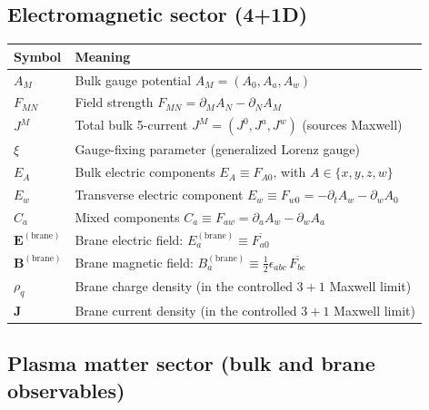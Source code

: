 \documentclass[11pt]{article}
\begin{document}
\subsection*{Electromagnetic sector (4+1D)}

\begin{center}
\begin{tabular}{@{}ll@{}}
\toprule
Symbol & Meaning \\
\midrule
$A_M$ & Bulk gauge potential $A_M=(A_0,A_a,A_w)$ \\
$F_{MN}$ & Field strength $F_{MN}=\partial_M A_N-\partial_N A_M$ \\
$J^M$ & Total bulk 5-current $J^M=(J^0,J^a,J^w)$ (sources Maxwell) \\
$\xi$ & Gauge-fixing parameter (generalized Lorenz gauge) \\
$E_A$ & Bulk electric components $E_A\equiv F_{A0}$, with $A\in\{x,y,z,w\}$ \\
$E_w$ & Transverse electric component $E_w\equiv F_{w0}=-\partial_t A_w-\partial_w A_0$ \\
$C_a$ & Mixed components $C_a\equiv F_{aw}=\partial_a A_w-\partial_w A_a$ \\
$\mathbf{E}^{(\mathrm{brane})}$ & Brane electric field: $E_a^{(\mathrm{brane})}\equiv \overline{F_{a0}}$ \\
$\mathbf{B}^{(\mathrm{brane})}$ & Brane magnetic field: $B_a^{(\mathrm{brane})}\equiv \tfrac12\epsilon_{abc}\,\overline{F_{bc}}$ \\
$\rho_q$ & Brane charge density (in the controlled $3+1$ Maxwell limit) \\
$\mathbf{J}$ & Brane current density (in the controlled $3+1$ Maxwell limit) \\
\bottomrule
\end{tabular}
\end{center}

\subsection*{Plasma matter sector (bulk and brane observables)}
\end{document}
